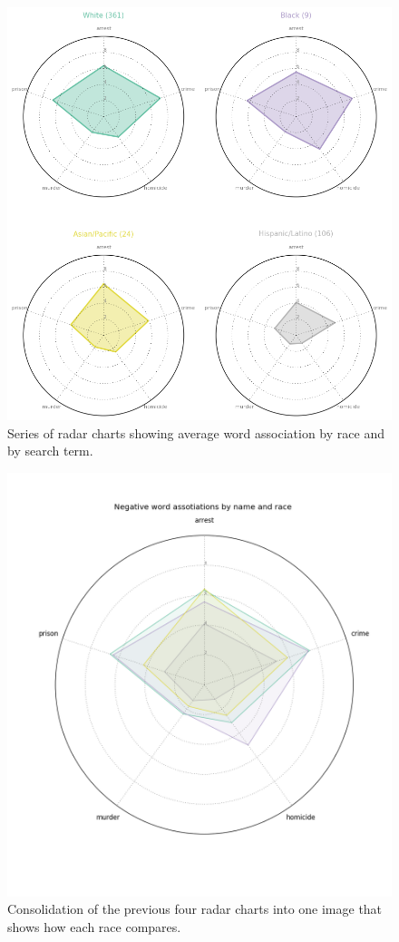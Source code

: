 \documentclass[sigconf]{acmart}
\begin{document}
\begin{figure}
\includegraphics[width=\columnwidth]{images/fig3.png}
\caption{Series of radar charts showing average word association by race and by search term.}
\label{Figure 3}
\end{figure}

\begin{figure}
\includegraphics[width=\columnwidth]{images/fig4.png}
\caption{Consolidation of the previous four radar charts into one image that shows how each race compares.}
\label{Figure 4}
\end{figure}
\end{document}
